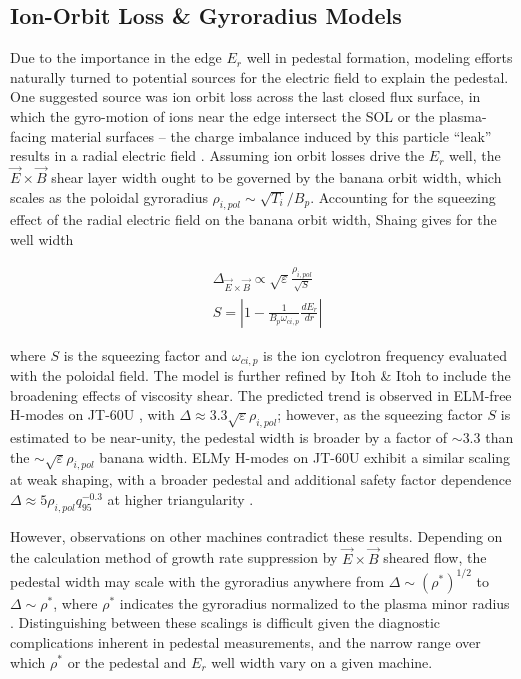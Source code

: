 \subsection{Ion-Orbit Loss \& Gyroradius Models}\label{subsec:mod_ionorbitloss}

Due to the importance in the edge $E_r$ well in pedestal formation, modeling efforts naturally turned to potential sources for the electric field to explain the pedestal.  One suggested source was ion orbit loss across the last closed flux surface, in which the gyro-motion of ions near the edge intersect the SOL or the plasma-facing material surfaces -- the charge imbalance induced by this particle ``leak'' results in a radial electric field \cite{Shaing1990}.  Assuming ion orbit losses drive the $E_r$ well, the $\vec{E}\times\vec{B}$ shear layer width ought to be governed by the banana orbit width, which scales as the poloidal gyroradius $\rho_{i,pol} \sim \sqrt{T_i}/B_p$.  Accounting for the squeezing effect of the radial electric field on the banana orbit width, Shaing \cite{Shaing1992} gives for the well width

\begin{equation}\label{eq:Shaing_width}
 \begin{aligned}
  &\Delta_{\vec{E}\times\vec{B}} \propto \sqrt{\varepsilon} \frac{\rho_{i,pol}}{\sqrt{S}}\\
  &S = \left| 1 - \frac{1}{B_p \omega_{ci,p}} \frac{dE_r}{dr}\right|
 \end{aligned}
\end{equation}

\noindent where $S$ is the squeezing factor and $\omega_{ci,p}$ is the ion cyclotron frequency evaluated with the poloidal field.  The model is further refined by Itoh \& Itoh \cite{Itoh1996} to include the broadening effects of viscosity shear.  The predicted trend is observed in ELM-free H-modes on JT-60U \cite{Hatae1998}, with $\Delta \approx 3.3 \sqrt{\varepsilon} \rho_{i,pol}$; however, as the squeezing factor $S$ is estimated to be near-unity, the pedestal width is broader by a factor of $\sim 3.3$ than the $\sim \sqrt{\varepsilon} \rho_{i,pol}$ banana width.  ELMy H-modes on JT-60U exhibit a similar scaling at weak shaping, with a broader pedestal and additional safety factor dependence $\Delta \approx 5 \rho_{i,pol} q_{95}^{-0.3}$ at higher triangularity \cite{Kamada1999}.

However, observations on other machines contradict these results.  Depending on the calculation method of growth rate suppression by $\vec{E}\times\vec{B}$ sheared flow, the pedestal width may scale with the gyroradius anywhere from $\Delta \sim \left(\rho^*\right)^{1/2}$ to $\Delta \sim \rho^*$, where $\rho^*$ indicates the gyroradius normalized to the plasma minor radius \cite{Beurskens2011}.  Distinguishing between these scalings is difficult given the diagnostic complications inherent in pedestal measurements, and the narrow range over which $\rho^*$ or the pedestal and $E_r$ well width vary on a given machine.


